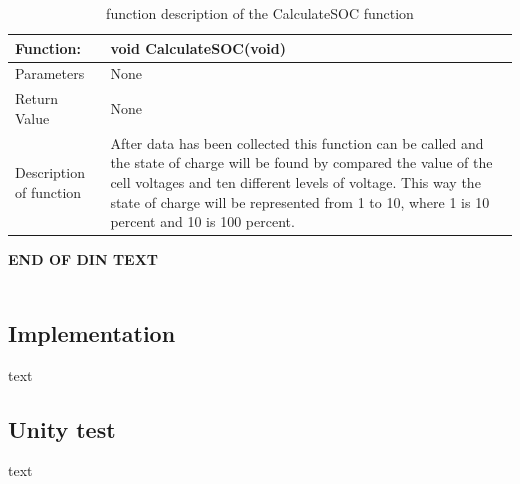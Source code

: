 \begin{table}[h!]
	\centering
	\label{CalculateSOCfunction}
	\begin{tabular}{|p{4 cm}|p{9 cm}|}
		\hline
		\textbf{Function:} & \textbf{void CalculateSOC(void)}	\\\hline
		Parameters	& None	\\\hline
		Return Value	& None	\\\hline
		Description of function	& After data has been collected this function can be called and the state of charge will be found by compared the value of the cell voltages and ten different levels of voltage. This way the state of charge will be represented from 1 to 10, where 1 is 10 percent and 10 is 100 percent.	\\\hline
	\end{tabular}
	\caption{function description of the CalculateSOC function}
\end{table}

\textbf{END OF DIN TEXT} \\ 
\\


\subsection{Implementation}
text

\subsection{Unity test}
text